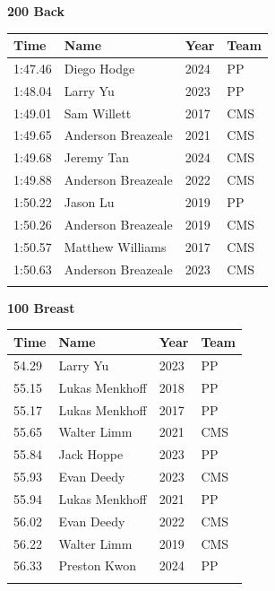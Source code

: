 \vspace{1.2em}
\noindent\begin{minipage}[t]{0.98\textwidth}
\centering
\textbf{\textcolor{teamprimary}{200 Back}}\par
\vspace{0.5em}
\centering
\small
\renewcommand{\arraystretch}{1.0}
\setlength{\tabcolsep}{4pt}
\begin{tabular}{@{}p{2.5cm}p{4.5cm}p{1.5cm}p{2.5cm}@{}}
\toprule
\textbf{Time} & \textbf{Name} & \textbf{Year} & \textbf{Team} \\
\midrule
1:47.46 & Diego Hodge & 2024 & PP \\
1:48.04 & Larry Yu & 2023 & PP \\
1:49.01 & Sam Willett & 2017 & CMS \\
1:49.65 & Anderson Breazeale & 2021 & CMS \\
1:49.68 & Jeremy Tan & 2024 & CMS \\
1:49.88 & Anderson Breazeale & 2022 & CMS \\
1:50.22 & Jason Lu & 2019 & PP \\
1:50.26 & Anderson Breazeale & 2019 & CMS \\
1:50.57 & Matthew Williams & 2017 & CMS \\
1:50.63 & Anderson Breazeale & 2023 & CMS \\
\bottomrule
\vspace{0.5em}
\end{tabular}
\end{minipage}
\vspace{1.2em}
\noindent\begin{minipage}[t]{0.98\textwidth}
\centering
\textbf{\textcolor{teamprimary}{100 Breast}}\par
\vspace{0.5em}
\centering
\small
\renewcommand{\arraystretch}{1.0}
\setlength{\tabcolsep}{4pt}
\begin{tabular}{@{}p{2.5cm}p{4.5cm}p{1.5cm}p{2.5cm}@{}}
\toprule
\textbf{Time} & \textbf{Name} & \textbf{Year} & \textbf{Team} \\
\midrule
54.29 & Larry Yu & 2023 & PP \\
55.15 & Lukas Menkhoff & 2018 & PP \\
55.17 & Lukas Menkhoff & 2017 & PP \\
55.65 & Walter Limm & 2021 & CMS \\
55.84 & Jack Hoppe & 2023 & PP \\
55.93 & Evan Deedy & 2023 & CMS \\
55.94 & Lukas Menkhoff & 2021 & PP \\
56.02 & Evan Deedy & 2022 & CMS \\
56.22 & Walter Limm & 2019 & CMS \\
56.33 & Preston Kwon & 2024 & PP \\
\bottomrule
\vspace{0.5em}
\end{tabular}
\end{minipage}
